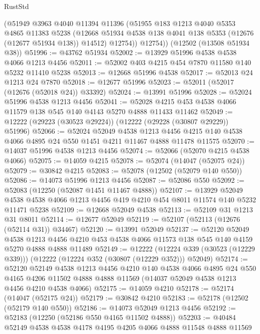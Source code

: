 \begin{lexlean}{RustStd}
\begin{coremodule}
        (@51949
          @3963
          @4040
          @11394
          @11396
          (@51955
            @183
            @1213
            @4040
            @5353
            @4865
            @11383
            @5238
            (@12668 @51934 @4538 @138 @4041 @138 @5353 (@12676 (@12677 @51934 @138)) @14512)
            @12754))
        @12754))
    (@12502 (@13508 @51934 @38))
@51996 := @43762 @51934
@52002 := @13929 @51996 @4538 @4538 @4066 @1213 @4456
@52011 := @52002 @403 @4215 @454 @7870 @11580 @140 @5232 @11410 @5238
@52013 := @12668 @51996 @4538
@52017 := @52013 @24 @1213 @24 @7870
@52018 := @12677 @51996
@52023 := @52011 (@52017 (@12676 (@52018 @24)) @33392)
@52024 := @13991 @51996
@52028 := @52024 @51996 @4538 @1213 @4456
@52041 := @52028 @4215 @453 @4538 @4066 @11579 @138 @545 @140 @4143 @5270 @4888 @11433 @11462
@52049 := @12222 (@29223 (@30523 @29224)) (@12222 (@29228 (@30807 @29229)) @51996)
@52066 := @52024
    @52049
    @4538
    @1213
    @4456
    @4215
    @140
    @4538
    @4066
    @4895
    @24
    @550
    @1451
    @4211
    @11467
    @4888
    @11478
    @11575
@52070 := @14037 @51996 @4538 @1213 @4456
@52074 := @52066 (@52070 @4215 @4538 @4066)
@52075 := @14059 @4215
@52078 := @52074 (@14047 (@52075 @24))
@52079 := @30842 @4215
@52083 := @52078 (@12502 (@52079 @140 @550))
@52086 := @14073 @51996 @1213 @4456
@52087 := @52086 @550
@52092 := @52083 (@12250 (@52087 @1451 @11467 @4888))
@52107 := @13929
    @52049
    @4538
    @4538
    @4066
    @1213
    @4456
    @419
    @4210
    @454
    @8011
    @11574
    @140
    @5232
    @11471
    @5238
@52109 := @12668 @52049 @4538
@52113 := @52109 @31 @1213 @31 @8011
@52114 := @12677 @52049
@52119 := @52107 (@52113 (@12676 (@52114 @31)) @34467)
@52120 := @13991 @52049
@52137 := @52120
    @52049
    @4538
    @1213
    @4456
    @4210
    @453
    @4538
    @4066
    @11573
    @138
    @545
    @140
    @4159
    @5270
    @4888
    @4888
    @11489
@52149 := @12222
    (@12224 @339 (@30523 (@12229 @339)))
    (@12222 (@12224 @352 (@30807 (@12229 @352))) @52049)
@52174 := @52120
    @52149
    @4538
    @1213
    @4456
    @4210
    @140
    @4538
    @4066
    @4895
    @24
    @550
    @4165
    @4206
    @11502
    @4888
    @4888
    @11569
    (@14037 @52049 @4538 @1213 @4456 @4210 @4538 @4066)
@52175 := @14059 @4210
@52178 := @52174 (@14047 (@52175 @24))
@52179 := @30842 @4210
@52183 := @52178 (@12502 (@52179 @140 @550))
@52186 := @14073 @52049 @1213 @4456
@52192 := @52183 (@12250 (@52186 @550 @4165 @11502 @4888))
@52203 := @40484 @52149 @4538 @4538 @4178 @4195 @4205 @4066 @4888 @11548 @4888 @11569

\end{coremodule}
\end{lexlean}
